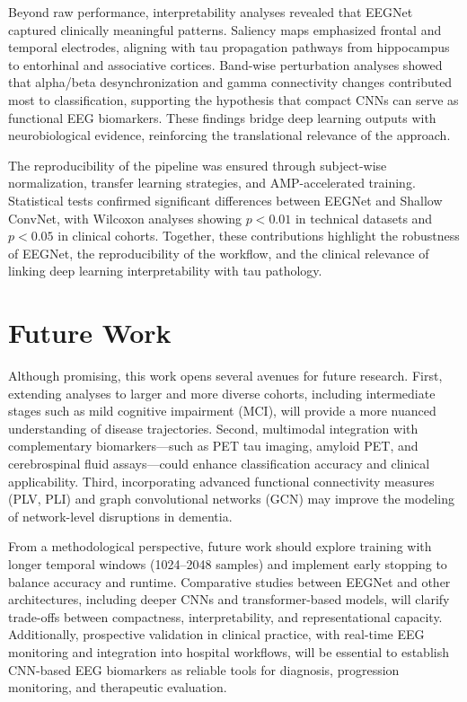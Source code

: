 \documentclass[12pt,a4paper]{article}
\begin{document}
Beyond raw performance, interpretability analyses revealed that EEGNet captured clinically meaningful patterns. Saliency maps emphasized frontal and temporal electrodes, aligning with tau propagation pathways from hippocampus to entorhinal and associative cortices. Band-wise perturbation analyses showed that alpha/beta desynchronization and gamma connectivity changes contributed most to classification, supporting the hypothesis that compact CNNs can serve as functional EEG biomarkers. These findings bridge deep learning outputs with neurobiological evidence, reinforcing the translational relevance of the approach.

The reproducibility of the pipeline was ensured through subject-wise normalization, transfer learning strategies, and AMP-accelerated training. Statistical tests confirmed significant differences between EEGNet and Shallow ConvNet, with Wilcoxon analyses showing $p < 0.01$ in technical datasets and $p < 0.05$ in clinical cohorts. Together, these contributions highlight the robustness of EEGNet, the reproducibility of the workflow, and the clinical relevance of linking deep learning interpretability with tau pathology.

\section{Future Work}

Although promising, this work opens several avenues for future research. First, extending analyses to larger and more diverse cohorts, including intermediate stages such as mild cognitive impairment (MCI), will provide a more nuanced understanding of disease trajectories. Second, multimodal integration with complementary biomarkers—such as PET tau imaging, amyloid PET, and cerebrospinal fluid assays—could enhance classification accuracy and clinical applicability. Third, incorporating advanced functional connectivity measures (PLV, PLI) and graph convolutional networks (GCN) may improve the modeling of network-level disruptions in dementia.

From a methodological perspective, future work should explore training with longer temporal windows (1024–2048 samples) and implement early stopping to balance accuracy and runtime. Comparative studies between EEGNet and other architectures, including deeper CNNs and transformer-based models, will clarify trade-offs between compactness, interpretability, and representational capacity. Additionally, prospective validation in clinical practice, with real-time EEG monitoring and integration into hospital workflows, will be essential to establish CNN-based EEG biomarkers as reliable tools for diagnosis, progression monitoring, and therapeutic evaluation.
\end{document}
